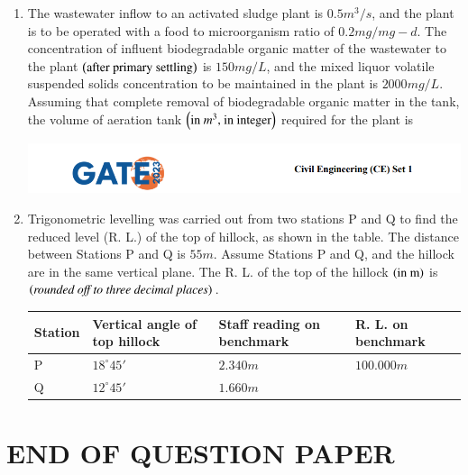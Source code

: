 \documentclass[journal,14pt,onecolumn]{IEEEtran}
\theoremstyle{remark}
\begin{document}
\begin{enumerate}[label={Q\arabic*.}]
\item The wastewater inflow to an activated sludge plant is $0.5 m^3
/s$, and the plant is to be operated with a food to microorganism ratio of $0.2 mg/mg-d$. The concentration of influent biodegradable organic matter of the wastewater to the plant $\left(\text{after primary settling}\right)$ is $150 mg/L$, and the mixed liquor volatile suspended solids concentration to be maintained in the plant is $2000 mg/L$. Assuming that complete removal of biodegradable organic matter in the tank, the volume of aeration tank $\left(\text{in $m^3$, in integer}\right)$ required for the plant is \underline{\hspace{3cm}}

\newpage

\includegraphics[width=\textwidth]{pics/header.png}
\item Trigonometric levelling was carried out from two stations P and Q to find the reduced level (R. L.) of the top of hillock, as shown in the table. The distance between Stations P and Q is $55 m$. Assume Stations P and Q, and the hillock are in the same vertical plane. The R. L. of the top of the hillock $\left(\text{in m}\right)$ is \underline{\hspace{3cm}} $\left(\textit{rounded off to three decimal places}\right)$.
\vspace{0.75cm}
\begin{table}[h!]
    \centering
    \begin{tabular}{|l|l|l|l|}
    \hline
    \textbf{Station} & \textbf{Vertical angle of top hillock} & \textbf{Staff reading on benchmark} & \textbf{R. L. on benchmark}\\
    \hline
    P & $18^\circ 45'$ & $2.340m$ & $100.000m$\\
    Q & $12^\circ 45'$ & $1.660m$ & \\
    \hline
    \end{tabular}
\end{table}

\end{enumerate}

\section*{END OF QUESTION PAPER}
\end{document}
